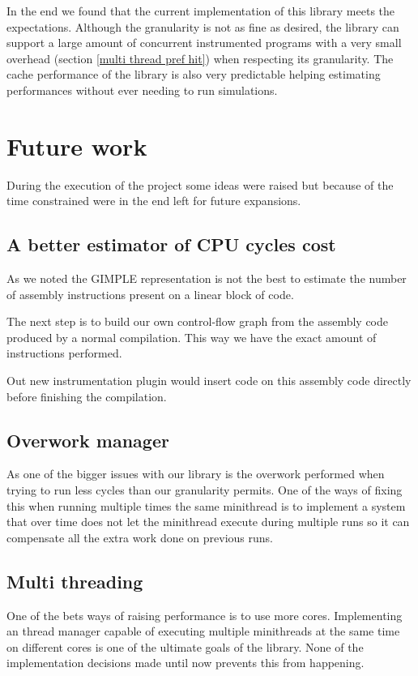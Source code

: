 \documentclass[12pt,a4paper]{report}
\begin{document}
In the end we found that the current implementation of this library meets the expectations. Although the granularity is not as fine as desired, the library can support a large amount of concurrent instrumented programs with a very small overhead (section \ref{multi thread pref hit}) when respecting its granularity. The cache performance of the library is also very predictable helping estimating performances without ever needing to run simulations.

\section{Future work}
During the execution of the project some ideas were raised but because of the time constrained were in the end left for future expansions.
\subsection{A better estimator of CPU cycles cost}
As we noted the GIMPLE representation is not the best to estimate the number of assembly instructions present on a linear block of code.

The next step is to build our own control-flow graph from the assembly code produced by a normal compilation. This way we have the exact amount of instructions performed. 

Out new instrumentation plugin would insert code on this assembly code directly before finishing the compilation.

\subsection{Overwork manager}
As one of the bigger issues with our library is the overwork performed when trying to run less cycles than our granularity permits. One of the ways of fixing this when running multiple times the same minithread is to implement a system that over time does not let the minithread execute during multiple runs so it can compensate all the extra work done on previous runs.

\subsection{Multi threading}
One of the bets ways of raising performance is to use more cores. Implementing an thread manager capable of executing multiple minithreads at the same time on different cores is one of the ultimate goals of the library. None of the implementation decisions made until now prevents this from happening. 
\end{document}
